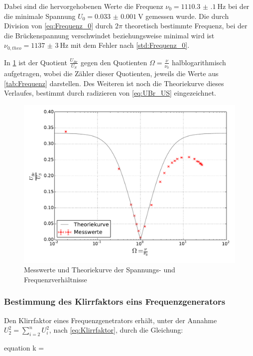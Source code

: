 	
	
	Dabei sind die hervorgehobenen Werte die Frequenz $\nu_{0} = \SI{1110.3(1)}{\hertz}$ bei der die minimale Spannung
	$U_{0} = \SI{0.033(1)}{\volt}$ gemessen wurde. Die durch Division von \cref{eq:Frequenz_0} durch $2\pi$ theoretisch 
	bestimmte Frequenz, bei der die 
	Brückenspannung verschwindet beziehungsweise minimal wird ist $\nu_{0,theo} = \SI{1137(3)}{\hertz}$ mit dem Fehler nach \cref{std:Frequenz_0}.     
	
	In \cref{fig:WienRobinson} ist der Quotient $\frac{U_{Br}}{U_{S}}$ gegen 
	den Quotienten  $\Omega = \frac{\nu}{\nu_{0}}$ halblogarithmisch aufgetragen, wobei die Zähler dieser Quotienten,
	jeweils die Werte aus \cref{tab:Frequenz} darstellen. Des Weiteren ist noch die Theoriekurve dieses Verlaufes, bestimmt durch radizieren von \cref{eq:UBr_US} eingezeichnet.  
		
	\begin{figure}[!h]
		\centering
		\includegraphics[scale=0.75]{Grafiken/WienRobinson.pdf}
		\caption{Messwerte und Theoriekurve der Spannungs- und Frequenzverhältnisse}
		\label{fig:WienRobinson}
	\end{figure}

\subsubsection{Bestimmung des Klirrfaktors eins Frequenzgenerators}
\label{sec:Auswertung_Klirrfaktor} 
	
	Den Klirrfaktor eines Frequenzgenetrators erhält, unter der Annahme $\displaystyle U_{2}^{2} = \sum_{i=2}^{n} U_{i}^{2}$,
	nach \cref{eq:Klirrfaktor}, durch die Gleichung:
	\begin{empheq}{equation}
		k = 
		\label{eq:Klirrfaktor2}
	\end{empheq}     
	
